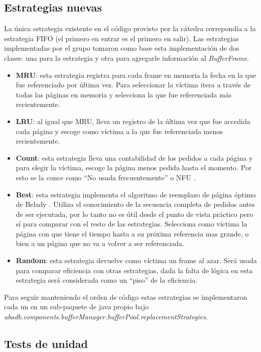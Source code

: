 \subsection{Estrategias nuevas}
La \'unica estrategia existente en el c\'odigo provisto por la c\'atedra correpond\'ia a la estrategia FIFO 
(el primero en entrar es el primero en salir). Las estrategias implementadas por el grupo tomaron como base esta
implementaci\'on de dos clases: una para la estrategia y otra para agregarle informaci\'on al \textit{BufferFrame}.
\begin{itemize}
\item \textbf{MRU}: esta estrategia registra para cada frame en memoria la fecha en la que fue referenciado por \'ultima vez. Para seleccionar la v\'ictima itera a trav\'es de todas las p\'aginas en memoria y selecciona la que fue referenciada m\'as recientemente.
\item \textbf{LRU}: al igual que MRU, lleva un registro de la \'ultima vez que fue accedida cada p\'agina y escoge como v\'ictima a la que fue referenciada menos recientemente.
\item \textbf{Count}: esta estrategia lleva una contabilidad de los pedidos a cada p\'agina y para elegir la v\'ictima, escoge 
la p\'agina menos pedida hasta el momento. Por esto se la conce como ``No usada frecuentemente'' o NFU \cite{wiki1}.
\item \textbf{Best}: esta estrategia implementa el algoritmo de reemplazo de p\'agina \'optimo de Belady \cite{bel66}. Utiliza el conocimiento de la secuencia completa de pedidos antes de ser ejecutada, por lo tanto no es \'util desde el punto de vista pr\'actico
pero s\'i para comparar con el resto de las estrategias. Selecciona como v\'ictima la p\'agina con que tiene el tiempo hasta a su pr\'oxima referencia mas grande, o bien a un p\'agina que no va a volver a ser referenciada.
\item \textbf{Random}: esta estrategia devuelve como v\'ictima un frame al azar. Ser\'a usada para 
comparar eficiencia con otras estrategias, dada la falta de l\'ogica en esta estrategia ser\'a considerada como un ``piso'' de la eficiencia. 
\end{itemize}
Para seguir manteniendo el orden de c\'odigo estas estrategias se implementaron cada un en un sub-paquete de java propio 
bajo \textit{ubadb.components.bufferManager.bufferPool.replacementStrategies}.

\subsection{Tests de unidad}


